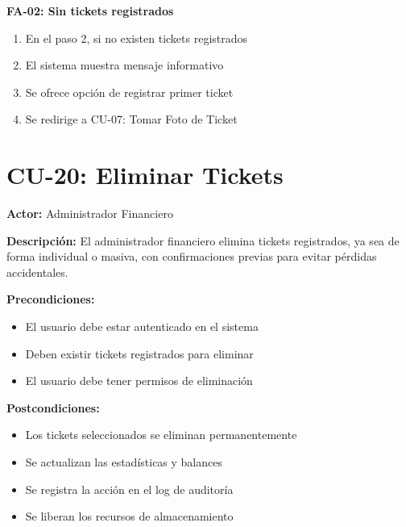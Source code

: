 \textbf{FA-02: Sin tickets registrados}
\begin{enumerate}
    \item En el paso 2, si no existen tickets registrados
    \item El sistema muestra mensaje informativo
    \item Se ofrece opción de registrar primer ticket
    \item Se redirige a CU-07: Tomar Foto de Ticket
\end{enumerate}

\section{CU-20: Eliminar Tickets}

\noindent\textbf{Actor:} Administrador Financiero

\noindent\textbf{Descripción:} El administrador financiero elimina tickets registrados, ya sea de forma individual o masiva, con confirmaciones previas para evitar pérdidas accidentales.

\noindent\textbf{Precondiciones:}
\begin{itemize}
    \item El usuario debe estar autenticado en el sistema
    \item Deben existir tickets registrados para eliminar
    \item El usuario debe tener permisos de eliminación
\end{itemize}

\noindent\textbf{Postcondiciones:}
\begin{itemize}
    \item Los tickets seleccionados se eliminan permanentemente
    \item Se actualizan las estadísticas y balances
    \item Se registra la acción en el log de auditoría
    \item Se liberan los recursos de almacenamiento
\end{itemize}

